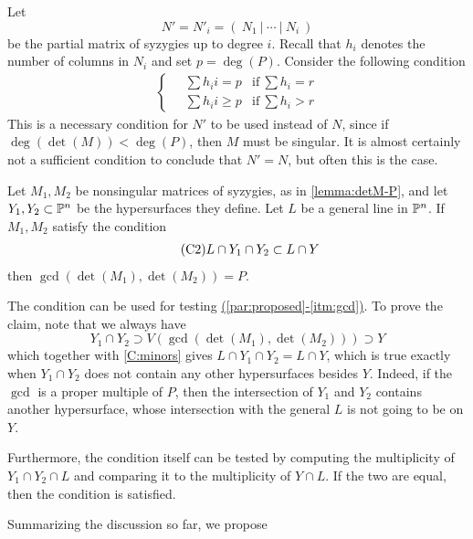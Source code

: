 \documentclass[fleqn,reqno]{amsart}
\renewcommand{\itmref}[2]{{\normalfont\hyperref[#1]{(\ref*{#2}-\ref*{#1})}}}
\begin{document}
\begin{paragraf}
Let
\[
	N'=N'_i=(~N_1~|~\cdots~|~N_i~)
\]
be the partial matrix of syzygies up to degree $i$.
Recall that $h_i$ denotes the number of columns in $N_i$
and set $p=\deg(P)$.
Consider the following condition
\begin{align}
	\label{C:matrix}
	\tag{C1}
	\begin{cases}
		\quad\sum h_ii=p &\text{if}~\sum h_i=r\\
		\quad\sum h_ii\geq p&\text{if}~\sum h_i>r
	\end{cases}
\end{align}
This is a necessary condition for $N'$ to be used instead of $N$,
since if $\deg(\det(M))<\deg(P)$, then $M$ must be singular.
It is almost certainly not a sufficient condition to conclude that $N'=N$,
but often this is the case.
\end{paragraf}

\begin{paragraf}
\label{par:intersect-general-line}
Let $M_1,M_2$ be nonsingular matrices of syzygies, as in \eqref{lemma:detM-P},
and let $Y_1,Y_2\subset\mathbb{P}^n$ be the hypersurfaces they define.
Let $L$ be a general line in $\mathbb{P}^n$.
If $M_1,M_2$ satisfy the condition
\begin{align}
	\label{C:minors}
	\tag{C2}
	L\cap Y_1\cap Y_2\subset L\cap Y
\end{align}
then $\gcd(\det(M_1),\det(M_2))=P$.

The condition can be used for testing \itmref{itm:gcd}{par:proposed}.
To prove the claim, note that we always have
\[
	Y_1\cap Y_2\supset V(\gcd(\det(M_1),\det(M_2)))\supset Y
\]
which together with \eqref{C:minors} gives $L\cap Y_1\cap Y_2=L\cap Y$,
which is true exactly when $Y_1\cap Y_2$ does not contain any other hypersurfaces besides $Y$.
Indeed, if the $\gcd$ is a proper multiple of $P$, then the intersection of
$Y_1$ and $Y_2$ contains another hypersurface, whose intersection with the general $L$
is not going to be on $Y$.

Furthermore, the condition itself can be tested by computing the multiplicity
of $Y_1\cap Y_2\cap L$ and comparing it to the multiplicity of $Y\cap L$.
If the two are equal, then the condition is satisfied.
\end{paragraf}

\begin{paragraf*}
Summarizing the discussion so far, we propose
\end{paragraf*}
\end{document}
